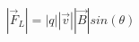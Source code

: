 \documentclass[preview]{standalone}
\begin{document}
\begin{align*}
| \vec{F}_L | = |q| | \vec{v} | | \vec{B} | sin(\theta)
\end{align*}
\end{document}
